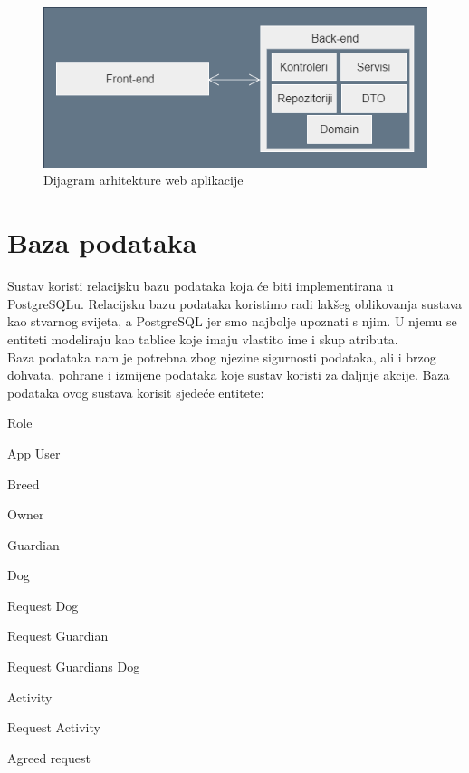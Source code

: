 		\begin{figure}[htb]
			\centering
			\includegraphics[width=14cm]{slike/arhitekturaaa}
			\caption{Dijagram arhitekture web aplikacije} 
			\label{fig:arhitektura-dijagram}
		\end{figure}
		
		\eject
				
		\section{Baza podataka}
			
			Sustav koristi relacijsku bazu podataka koja će biti implementirana u PostgreSQLu. Relacijsku bazu podataka koristimo radi lakšeg oblikovanja sustava kao stvarnog svijeta, a PostgreSQL jer smo najbolje upoznati s njim. U njemu se entiteti modeliraju kao tablice koje imaju vlastito ime i skup atributa.\\
			Baza podataka nam je potrebna zbog njezine sigurnosti podataka, ali i brzog dohvata, pohrane i izmijene podataka koje sustav koristi za daljnje akcije.
			Baza podataka ovog sustava korisit sjedeće entitete:
			\begin{packed_item}
				\item Role
				\item App User
				\item Breed
				\item Owner
				\item Guardian
				\item Dog
				\item Request Dog
				\item Request Guardian
				\item Request Guardians Dog
				\item Activity
				\item Request Activity
				\item Agreed request
				
			\end{packed_item}
			

